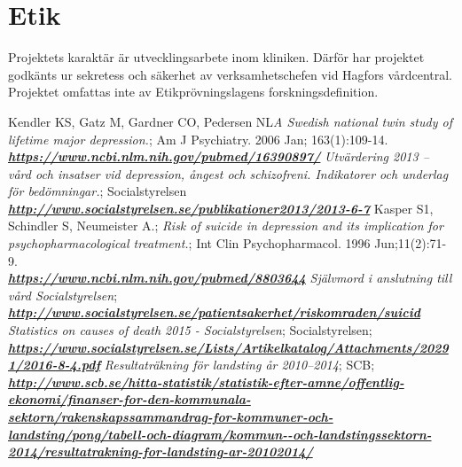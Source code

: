 \documentclass[12pt,a4paper,oneside]{article}
\begin{document}
\section*{Etik}
Projektets karakt{\"a}r {\"a}r utvecklingsarbete inom kliniken. D{\"a}rf{\"o}r har projektet godk{\"a}nts ur sekretess och s{\"a}kerhet av verksamhetschefen vid Hagfors v{\aa}rdcentral. Projektet omfattas inte av Etikpr{\"o}vningslagens forskningsdefinition.

\begin{thebibliography}{11}
Kendler KS, Gatz M, Gardner CO, Pedersen NL\emph{A Swedish national twin study of lifetime major depression.}; Am J Psychiatry. 2006 Jan; 163(1):109-14.\\\textbf{\emph{\href{https://www.ncbi.nlm.nih.gov/pubmed/16390897/}{\url{https://www.ncbi.nlm.nih.gov/pubmed/16390897/}}}}
 \emph{Utv{\"a}rdering 2013 -- v\r{a}rd och insatser vid depression, \r{a}ngest och schizofreni. Indikatorer och underlag f{\"o}r bed{\"o}mningar.}; Socialstyrelsen\\\textbf{\emph{\href{http://www.socialstyrelsen.se/publikationer2013/2013-6-7}{\url{http://www.socialstyrelsen.se/publikationer2013/2013-6-7}}}}
 Kasper S1, Schindler S, Neumeister A.; \emph{Risk of suicide in depression and its implication for psychopharmacological treatment.}; Int Clin Psychopharmacol. 1996 Jun;11(2):71-9.\\\textbf{\emph{\href{https://www.ncbi.nlm.nih.gov/pubmed/8803644}{\url{https://www.ncbi.nlm.nih.gov/pubmed/8803644}}}}
 \emph{Sj{\"a}lvmord i anslutning till v\r{a}rd Socialstyrelsen};\\\textbf{\emph{\href{http://www.socialstyrelsen.se/patientsakerhet/riskomraden/suicid}{\url{http://www.socialstyrelsen.se/patientsakerhet/riskomraden/suicid
}}}}
\emph{Statistics on causes of death 2015 - Socialstyrelsen}; Socialstyrelsen;
\\\textbf{\emph{\href{https://www.socialstyrelsen.se/Lists/Artikelkatalog/Attachments/20291/2016-8-4.pdf}{\url{
https://www.socialstyrelsen.se/Lists/Artikelkatalog/Attachments/20291/2016-8-4.pdf}}}}
 \emph{Resultatr{\"a}kning f{\"o}r landsting \r{a}r 2010--2014}; SCB;\\\textbf{\emph{\href{ http://www.scb.se/hitta-statistik/statistik-efter-amne/offentlig-ekonomi/finanser-for-den-kommunala-sektorn/rakenskapssammandrag-for-kommuner-och-landsting/pong/tabell-och-diagram/kommun--och-landstingssektorn-2014/resultatrakning-for-landsting-ar-20102014/}{\url{http://www.scb.se/hitta-statistik/statistik-efter-amne/offentlig-ekonomi/finanser-for-den-kommunala-sektorn/rakenskapssammandrag-for-kommuner-och-landsting/pong/tabell-och-diagram/kommun--och-landstingssektorn-2014/resultatrakning-for-landsting-ar-20102014/}}}}

\end{thebibliography}
\end{document}
